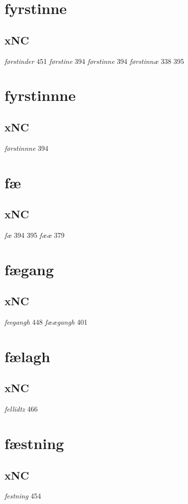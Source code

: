 \documentclass[a4paper,twocolumn]{article}
\begin{document}
\section{fyrstinne}
\label{sec:org7d61e2d}
\subsection{xNC}
\label{sec:org0b5b3f1}
\emph{førstinder} 451 \emph{førstine} 394 \emph{førstinne} 394 \emph{førstinnæ} 338 395 
\section{fyrstinnne}
\label{sec:org208bab3}
\subsection{xNC}
\label{sec:org2b65aba}
\emph{førstinnne} 394 
\section{fæ}
\label{sec:org91f7670}
\subsection{xNC}
\label{sec:org3bdaf3f}
\emph{fæ} 394 395 \emph{fææ} 379 
\section{fægang}
\label{sec:org2d349b8}
\subsection{xNC}
\label{sec:org4b5443d}
\emph{feegangh} 448 \emph{fæægangh} 401 
\section{fælagh}
\label{sec:org34ac72c}
\subsection{xNC}
\label{sec:orge117c60}
\emph{fellidtz} 466 
\section{fæstning}
\label{sec:orgd0359cc}
\subsection{xNC}
\label{sec:orgac5d042}
\emph{festning} 454 
\end{document}
